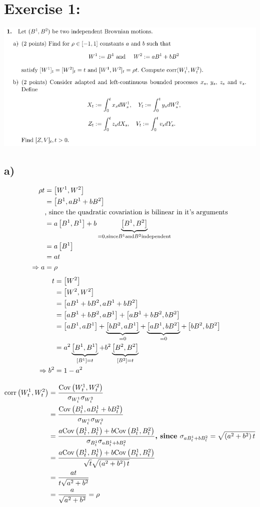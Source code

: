 \documentclass[document.tex]{subfiles}
\begin{document}
\section*{Exercise 1:}

\includegraphics[width=\textwidth]{ex1.png}

\subsection*{a)}
\begin{align*}
	\rho t &= \left[W^1 , W^2 \right] \\
	&= \left[B^1 , a B^1 + b B^2 \right] \\
	&\text{, since the quadratic covariation is bilinear in it's arguments}\\
	&= a \left[B^1 , B^1 \right] + b \underbrace{\left[B^1 , B^2 \right]}_{=0, \text{since} B^1 \text{and} B^2 \text{independent}} \\
	&= a \left[ B^1 \right] \\
	&= a t \\
\Rightarrow a &= \rho	 
\end{align*}
\begin{align*}
	t &= \left[ W^2 \right] \\
	&= \left[W^2 , W^2 \right]\\
	&= \left[a B^1 + b B^2 , a B^1 + b B^2 \right]\\
	&= \left[a B^1 + b B^2 , a B^1 \right] + \left[a B^1 + b B^2 , b B^2 \right]\\
	&= \left[aB^1 , aB^1 \right] + \underbrace{\left[bB^2 , aB^1 \right]}_{=0} + \underbrace{\left[aB^1 , bB^2 \right]}_{=0} + \left[bB^2 , bB^2 \right]\\
	&= a^2 \underbrace{\left[B^1 , B^1 \right]}_{\left[ B^1 \right]=t}+ b^2 \underbrace{\left[B^2 , B^2 \right]}_{\left[ B^2 \right]=t} \\
\Rightarrow	b^2 &= 1 - a^2
\end{align*}

\begin{align*}
	\mathrm{corr}\left(W^1_t , W^2_t\right) &= \frac{\mathrm{Cov}\left(W^1_t , W^2_t\right)}{\sigma_{W^1_t}\sigma_{W^2_t}}\\ 
	&= \frac{\mathrm{Cov}\left(B^1_t , aB^1_t + b B^2_t\right)}  {\sigma_{W^1_t}\sigma_{W^2_t}} \\
	&= \frac{a \mathrm{Cov}\left(B^1_t , B^1_t\right) + b\mathrm{Cov}\left(B^1_t , B^2_t\right)}{\sigma_{B^1_t} \sigma_{a B^1_t + b B^2_t}}
	\textbf{, since } \sigma_{a B^1_t + b B^2_t} = \sqrt{\left( a^2+b^2 \right) t} \\
	&= \frac{a \mathrm{Cov}\left(B^1_t , B^1_t\right) + b\mathrm{Cov}\left(B^1_t , B^2_t\right)}{ \sqrt{t} \sqrt{\left( a^2+b^2 \right) t}}\\
	&= \frac{at}{  t \sqrt{a^2+b^2}} \\
	 &= \frac{a}{\sqrt{a^2+b^2}} = \rho
\end{align*}
\end{document}
